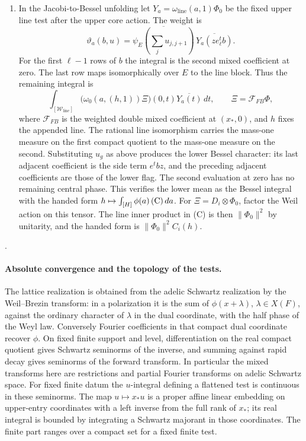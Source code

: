 \begin{enumerate}
\item In the Jacobi-to-Bessel unfolding let
\(Y_a=\omega_{\mathrm{line}}(a,1)\Phi_0\) be the fixed
upper line test after the upper core action. The weight is
\[
 \vartheta_a(b,u)
 =\overline{\psi_E(\sum_j u_{j,j+1})}
                  \,\overline{Y_a(z e_\ell^t b)} .
\]
For the first
\(\ell-1\) rows of \(b\) the integral is the second
mixed coefficient at zero. The last row maps isomorphically
over \(E\) to the line block. Thus the remaining integral is
\[
 \int_{[\mathscr W_{\mathrm{line}}]}
   \bigl(\omega_0(a,(h,1))\Xi\bigr)(0,t)
                  \overline{Y_a(t)}\,dt,
 \qquad \Xi=\mathcal F_{FB}\Phi ,
 \tag{C}
\]
where \(\mathcal F_{FB}\) is the weighted double mixed
coefficient at \((x_*,0)\), and \(h\) fixes the appended
line. The rational line isomorphism carries the mass-one
measure on the first compact quotient to the mass-one measure
on the second. Substituting \(u_g\) as above produces the
lower Bessel character: its last adjacent coefficient is the
side term \(e^t b z\), and the preceding adjacent
coefficients are those of the lower flag. The second evaluation
at zero has no remaining central phase. This verifies the
lower mean as the Bessel integral with the handed form
\(h\mapsto\int_{[H]}\phi(a)\,\textup{(C)}\,da\).
For \(\Xi=D_i\otimes\Phi_0\), factor the Weil action
on this tensor. The line inner product in (C) is then
\(\|\Phi_0\|^2\) by unitarity, and the handed form is
\(\|\Phi_0\|^2 C_i(h)\).
\end{enumerate}
.

\paragraph{Absolute convergence and the topology of the tests.}
The lattice realization is obtained from the adelic Schwartz
realization by the Weil--Brezin transform: in a polarization it
is the sum of \(\phi(x+\lambda)\), \(\lambda\in X(F)\),
against the ordinary character of \(\lambda\) in the dual
coordinate, with the half phase of the Weyl law. Conversely
Fourier coefficients in that compact dual coordinate recover
\(\phi\). On fixed finite support and level, differentiation
on the real compact quotient gives Schwartz seminorms of the
inverse, and summing against rapid decay gives seminorms of
the forward transform. In particular the mixed transforms here
are restrictions and partial Fourier transforms on adelic
Schwartz space. For fixed finite datum the \(u\)-integral
defining a flattened test is continuous in these seminorms.
The map \(u\mapsto x_*u\) is a proper affine linear
embedding on upper-entry coordinates with a left inverse from
the full rank of \(x_*\); its real integral is bounded by
integrating a Schwartz majorant in those coordinates. The
finite part ranges over a compact set for a fixed finite test.

